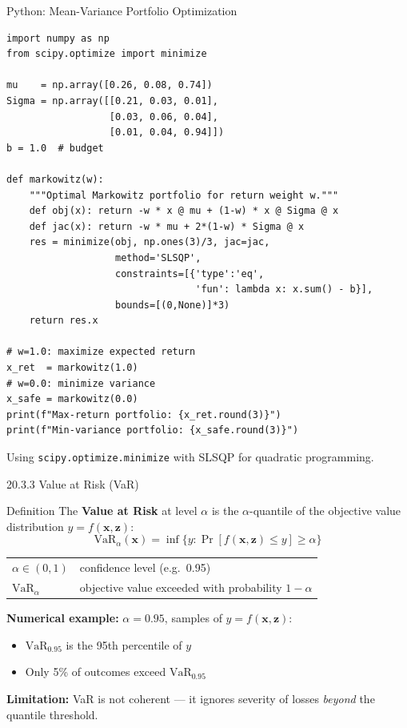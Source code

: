 \documentclass[aspectratio=169,10pt]{beamer}
\newcommand{\x}{\mathbf{x}}
\newcommand{\z}{\mathbf{z}}
\begin{document}
\begin{frame}[fragile]{Python: Mean-Variance Portfolio Optimization}
\begin{lstlisting}
import numpy as np
from scipy.optimize import minimize

mu    = np.array([0.26, 0.08, 0.74])
Sigma = np.array([[0.21, 0.03, 0.01],
                  [0.03, 0.06, 0.04],
                  [0.01, 0.04, 0.94]])
b = 1.0  # budget

def markowitz(w):
    """Optimal Markowitz portfolio for return weight w."""
    def obj(x): return -w * x @ mu + (1-w) * x @ Sigma @ x
    def jac(x): return -w * mu + 2*(1-w) * Sigma @ x
    res = minimize(obj, np.ones(3)/3, jac=jac,
                   method='SLSQP',
                   constraints=[{'type':'eq',
                                 'fun': lambda x: x.sum() - b}],
                   bounds=[(0,None)]*3)
    return res.x

# w=1.0: maximize expected return
x_ret  = markowitz(1.0)
# w=0.0: minimize variance
x_safe = markowitz(0.0)
print(f"Max-return portfolio: {x_ret.round(3)}")
print(f"Min-variance portfolio: {x_safe.round(3)}")
\end{lstlisting}
\vspace{2pt}
{\small Using \texttt{scipy.optimize.minimize} with SLSQP for quadratic programming.}
\end{frame}

\begin{frame}{20.3.3 \; Value at Risk (VaR)}
  \begin{block}{Definition}
    The \textbf{Value at Risk} at level $\alpha$ is the $\alpha$-quantile of the
    objective value distribution $y = f(\x,\z)$:
    \[
      \mathrm{VaR}_\alpha(\x) = \inf\bigl\{y : \Pr[f(\x,\z) \le y] \ge \alpha \bigr\}
    \]
    \begin{tabular}{ll}
      $\alpha \in (0,1)$       & confidence level (e.g.\ 0.95)\\
      $\mathrm{VaR}_\alpha$    & objective value exceeded with probability $1-\alpha$\\
    \end{tabular}
  \end{block}
  \vspace{4pt}
  \textbf{Numerical example:} $\alpha = 0.95$, samples of $y = f(\x,\z)$:\\
  \begin{itemize}
    \item $\mathrm{VaR}_{0.95}$ is the 95th percentile of $y$
    \item Only 5\% of outcomes exceed $\mathrm{VaR}_{0.95}$
  \end{itemize}
  \vspace{4pt}
  \textbf{Limitation:} VaR is not coherent — it ignores severity of
  losses \emph{beyond} the quantile threshold.
\end{frame}
\end{document}
